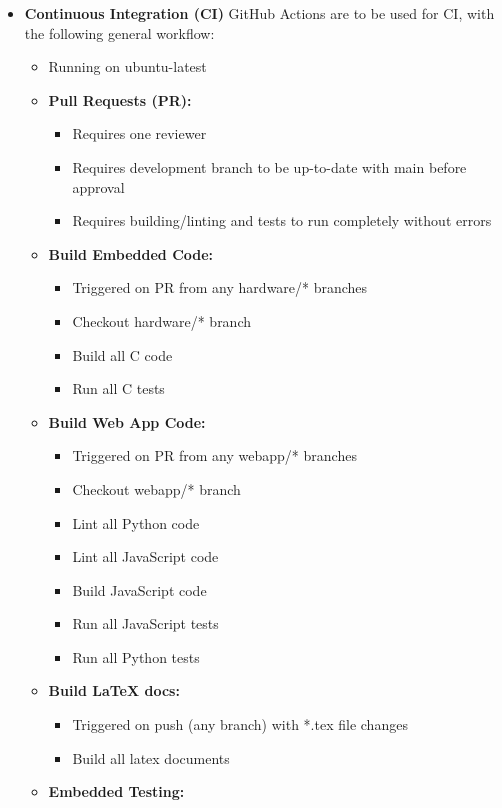 \documentclass{article}
\begin{document}
\begin{itemize}
\item \textbf{Continuous Integration (CI)} GitHub Actions are to be used for CI, with the following general workflow:
\begin{itemize}
    \item Running on ubuntu-latest
    \item \textbf{Pull Requests (PR):} 
    \begin{itemize}
        \item Requires one reviewer
        \item Requires development branch to be up-to-date with main before approval
        \item Requires building/linting and tests to run completely without errors
    \end{itemize}
    \item \textbf{Build Embedded Code:}
    \begin{itemize}
        \item Triggered on PR from any hardware/* branches
        \item Checkout hardware/* branch
        \item Build all C code
        \item Run all C tests
    \end{itemize}
    \item \textbf{Build Web App Code:} 
    \begin{itemize}
        \item Triggered on PR from any webapp/* branches
        \item Checkout webapp/* branch
        \item Lint all Python code
        \item Lint all JavaScript code
        \item Build JavaScript code
        \item Run all JavaScript tests
        \item Run all Python tests
    \end{itemize}
    \item \textbf{Build LaTeX docs:} 
    \begin{itemize}
        \item Triggered on push (any branch) with *.tex file changes
        \item Build all latex documents
    \end{itemize}
    \item \textbf{Embedded Testing:} 
    \begin{itemize}

\end{itemize}
\end{itemize}
\end{itemize}
\end{document}
